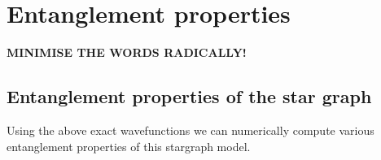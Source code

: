 \documentclass[reprint,prb,superscriptaddress]{revtex4-2}
\begin{document}
%


\section{Entanglement properties}
\textbf{MINIMISE THE WORDS RADICALLY!}
\subsection{Entanglement properties of the star graph}
\noindent Using the above exact wavefunctions we can numerically compute various entanglement properties of this stargraph model. 
\end{document}
